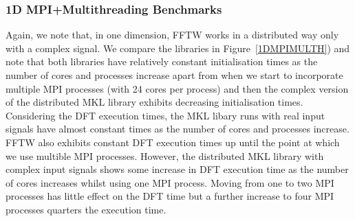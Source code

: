 \documentclass[12pt, a4paper]{article} \setlength{\textheight}{24cm}
\begin{document}
\subsubsection{1D MPI+Multithreading Benchmarks}\label{Sec:1DMPIThread}
Again, we note that, in one dimension, FFTW works in a distributed way
only with a complex signal.  We compare the libraries in
Figure~\ref{1DMPIMULTH}) and note that both libraries have relatively
constant initialisation times as the number of cores and processes
increase apart from when we start to incorporate multiple MPI
processes (with 24 cores per process) and then the complex version of
the distributed MKL library exhibits decreasing initialisation times.
Considering the DFT execution times, the MKL libary runs with real
input signals have almost constant times as the number of cores and
processes increase. FFTW also exhibits constant DFT execution times up
until the point at which we use multible MPI processes. However, the
distributed MKL library with complex input signals shows some increase
in DFT execution time as the number of cores increases whilst using
one MPI process. Moving from one to two MPI processes has little
effect on the DFT time but a further increase to four MPI processes
quarters the execution time.
\end{document}
